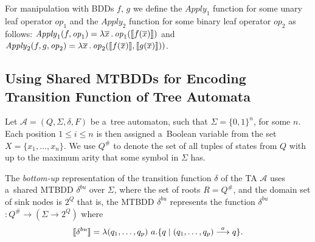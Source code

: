 For manipulation with BDDs $f$, $g$ we define the $\mathit{Apply}_1$ function
for some unary leaf operator $\mathit{op}_1$ and the $\mathit{Apply}_2$ function for some
binary leaf operator $\mathit{op}_2$ as follows: $\mathit{Apply}_1(f,
\mathit{op}_1) = \lambda
\overline{x}\,.\,\mathit{op}_1(\text{\textlbrackdbl}f(\overline{x})\text{\textrbrackdbl})$
and $\mathit{Apply}_2(f, g, \mathit{op}_2) = \lambda
\overline{x}\,.\,\mathit{op}_2(\text{\textlbrackdbl}f(\overline{x})\text{\textrbrackdbl},
\text{\textlbrackdbl}g(\overline{x})\text{\textrbrackdbl}))$.

\subsection[Usage
of MTBDDs with TA]{Using Shared MTBDDs for Encoding Transition Function of Tree Automata} Let $\mathcal{A} = (Q, \Sigma, \delta, F)$
be a~tree automaton, such that $\Sigma = \{0, 1\}^n$, for some $n$. Each
position $1 \leq i \leq n$ is then assigned a~Boolean variable from the set $X =
\{x_1,\ldots,x_n\}$. We use $Q^\#$ to denote the set of all tuples of states from $Q$ with up to the
maximum arity that some symbol in $\Sigma$ has.

The \emph{bottom-up} representation of the transition function $\delta$ of the
TA $\mathcal{A}$ uses a~shared MTBDD $\delta^{bu}$ over $\Sigma$, where the set
of roots $R = Q^\#$, and the domain set of sink nodes is $2^Q$ that is, the
MTBDD $\delta^{bu}$ represents the function \textlbrackdbl $\delta^{bu}$
\textrbrackdbl $: Q^\# \rightarrow (\Sigma \rightarrow 2^Q)$ where
 \begin{equation}
  \text{\textlbrackdbl} \delta^{bu} \text{\textrbrackdbl} =
 \lambda (q_1,\ldots,q_p)\ a . \{q \mid (q_1,\ldots,q_p)
 \overset{a}{\longrightarrow} q\}. \end{equation}

